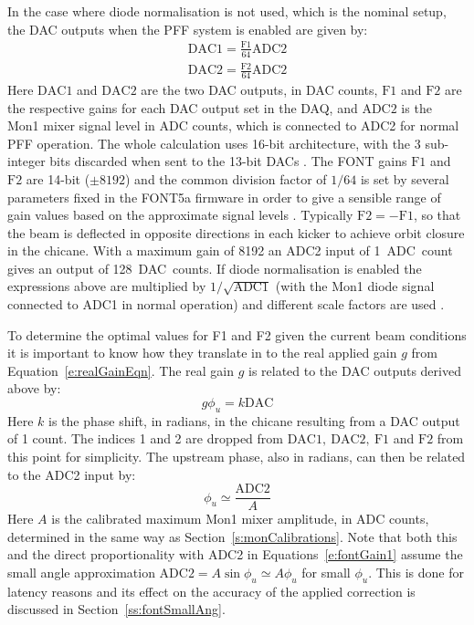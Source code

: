 In the case where diode normalisation is not used, which is the nominal setup, the DAC outputs when the PFF system is enabled are given by:
\begin{eqnarray}
\mathrm{DAC1} = \frac{\mathrm{F1}}{64}\mathrm{ADC2} \nonumber \\ 
\mathrm{DAC2} = \frac{\mathrm{F2}}{64}\mathrm{ADC2} \label{e:fontGain1}
\end{eqnarray}
Here \(\mathrm{DAC1}\) and \(\mathrm{DAC2}\) are the two DAC outputs, in DAC counts, \(\mathrm{F1}\) and \(\mathrm{F2}\) are the respective gains for each DAC output set in the DAQ, and \(\mathrm{ADC2}\) is the Mon1 mixer signal level in ADC counts, which is connected to ADC2 for normal PFF operation. The whole calculation uses 16-bit architecture, with the 3 sub-integer bits discarded when sent to the 13-bit DACs \cite{glennPriv}. The FONT gains \(\mathrm{F1}\) and \(\mathrm{F2}\) are 14-bit (\(\pm8192\)) and the common division factor of \(1/64\) is set by several parameters fixed in the FONT5a firmware in order to give a sensible range of gain values based on the approximate signal levels \cite{glennPriv}. Typically \(\mathrm{F2} = -\mathrm{F1}\), so that the beam is deflected in opposite directions in each kicker to achieve orbit closure in the chicane. With a maximum gain of 8192 an ADC2 input of 1~ADC~count gives an output of 128~DAC~counts. If diode normalisation is enabled the expressions above are multiplied by \(1/\sqrt{\mathrm{ADC1}}\) (with the Mon1 diode signal connected to ADC1 in normal operation) and different scale factors are used \cite{glennPriv}.

To determine the optimal values for F1 and F2 given the current beam conditions it is important to know how they translate in to the real applied gain \(g\) from Equation~\ref{e:realGainEqn}. The real gain \(g\) is related to the DAC outputs derived above by:
\begin{equation} \label{e:fontGain2}
g\phi_u = k\mathrm{DAC}
\end{equation}
Here \(k\) is the phase shift, in radians, in the chicane resulting from a DAC output of 1 count. The indices 1 and 2 are dropped from \(\mathrm{DAC1,~DAC2,~F1}\) and \(\mathrm{F2}\) from this point for simplicity. The upstream phase, also in radians, can then be related to the ADC2 input by:
\begin{equation} \label{e:fontGain3}
\phi_u \simeq \frac{\mathrm{ADC2}}{A}
\end{equation}
Here \(A\) is the calibrated maximum Mon1 mixer amplitude, in ADC counts, determined in the same way as Section~\ref{s:monCalibrations}. Note that both this and the direct proportionality with ADC2 in Equations~\ref{e:fontGain1} assume the small angle approximation \(\mathrm{ADC2} = A\sin\phi_u \simeq A\phi_u\) for small \(\phi_u\). This is done for latency reasons \cite{glennPriv} and its effect on the accuracy of the applied correction is discussed in Section~\ref{ss:fontSmallAng}.

